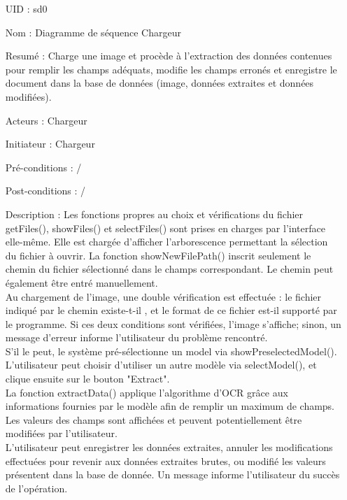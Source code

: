 \begin{enumerate}[label=\bfseries]
	\item[{UID :}] sd0
	\item[{Nom :}] Diagramme de séquence Chargeur
	\item[{Resumé :}]  Charge une image et procède à l'extraction des données contenues pour remplir les champs adéquats, modifie les champs erronés et enregistre le document dans la base de données (image, données extraites et données modifiées).
	\item[{Acteurs :}] Chargeur
	\item[{Initiateur :}] Chargeur
	\item[{Pré-conditions :}]  /
	\item[{Post-conditions :}]  /
	\item[{Description :}]
	Les fonctions propres au choix et vérifications du fichier getFiles(), showFiles() et selectFiles() sont prises en charges par l'interface elle-même. Elle est chargée d'afficher l'arborescence permettant la sélection du fichier à ouvrir. La fonction showNewFilePath() inscrit seulement le chemin du fichier sélectionné dans le champs correspondant. Le chemin peut également être entré manuellement. \\
	Au chargement de l'image, une double vérification est effectuée : le fichier indiqué par le chemin existe-t-il , et le format de ce fichier est-il supporté par le programme. Si ces deux conditions sont vérifiées, l'image s'affiche; sinon, un message d'erreur informe l'utilisateur du problème rencontré.\\
	S'il le peut, le système pré-sélectionne un model via showPreselectedModel().
	L'utilisateur peut choisir d'utiliser un autre modèle via selectModel(), et clique ensuite sur le bouton "Extract". \\
	La fonction extractData() applique l'algorithme d'OCR grâce aux informations fournies par le modèle afin de remplir un maximum de champs. Les valeurs des champs sont affichées et peuvent potentiellement être modifiées par l'utilisateur. \\
	L'utilisateur peut enregistrer les données extraites, annuler les modifications effectuées pour revenir aux données extraites brutes, ou modifié les valeurs présentent dans la base de donnée. Un message informe l'utilisateur du succès de l'opération.
\end{enumerate}

